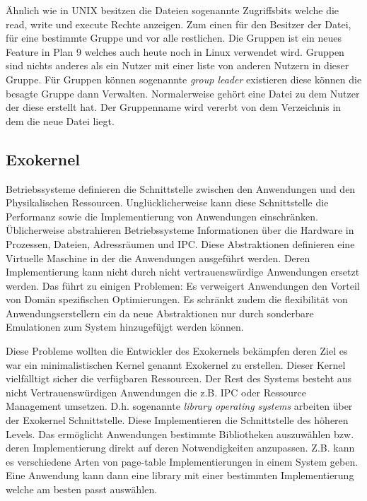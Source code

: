 \documentclass[9pt,technote]{IEEEtran}
\begin{document}
       \"Ahnlich wie in UNIX besitzen die Dateien sogenannte Zugriffsbits welche die read, write und execute Rechte anzeigen. Zum einen f\"ur den Besitzer der Datei, f\"ur eine bestimmte
       Gruppe und vor alle restlichen. Die Gruppen ist ein neues Feature in Plan 9 welches auch heute noch in Linux verwendet wird. Gruppen sind nichts anderes
       als ein Nutzer mit einer liste von anderen Nutzern in dieser Gruppe. F\"ur Gruppen k\"onnen sogenannte \textit{group leader} existieren diese k\"onnen die
       besagte Gruppe dann Verwalten. Normalerweise geh\"ort eine Datei zu dem Nutzer der diese erstellt hat. Der Gruppenname wird vererbt von dem Verzeichnis in dem die neue Datei liegt.
    \subsection{Exokernel}       
       Betriebssysteme definieren die Schnittstelle zwischen den Anwendungen und den Physikalischen Ressourcen.
       Ungl\"ucklicherweise kann diese Schnittstelle die Performanz sowie die Implementierung von Anwendungen einschr\"anken. \"Ublicherweise
       abstrahieren Betriebssysteme Informationen \"uber die Hardware in Prozessen, Dateien, Adressr\"aumen und IPC. Diese Abstraktionen definieren eine 
       Virtuelle Maschine in der die Anwendungen ausgef\"uhrt werden. Deren Implementierung kann nicht durch nicht vertrauensw\"urdige Anwendungen ersetzt werden.
        Das f\"uhrt zu einigen Problemen: Es verweigert Anwendungen den Vorteil von Dom\"an spezifischen Optimierungen. Es schr\"ankt zudem die flexibilit\"at von
        Anwendungserstellern ein da neue Abstraktionen nur durch sonderbare Emulationen zum System hinzugef\"ujgt werden k\"onnen.
        
        Diese Probleme wollten die Entwickler des Exokernels bek\"ampfen deren Ziel es war ein minimalistischen Kernel genannt Exokernel zu erstellen.
        Dieser Kernel vielf\"alltigt sicher die verf\"ugbaren Ressourcen. Der Rest des Systems besteht aus nicht Vertrauensw\"urdigen Anwendungen die
        z.B. IPC oder Ressource Management umsetzen. D.h. sogenannte \textit{library operating systems} arbeiten \"uber der Exokernel Schnittstelle. 
        Diese Implementieren die Schnittstelle des h\"oheren Levels. Das erm\"oglicht Anwendungen bestimmte Bibliotheken auszuw\"ahlen bzw.
        deren Implementierung direkt auf deren Notwendigkeiten anzupassen. Z.B. kann es verschiedene Arten von page-table Implementierungen
        in einem System geben. Eine Anwendung kann dann eine library mit einer bestimmten Implementierung welche am besten passt ausw\"ahlen.
        
\end{document}
